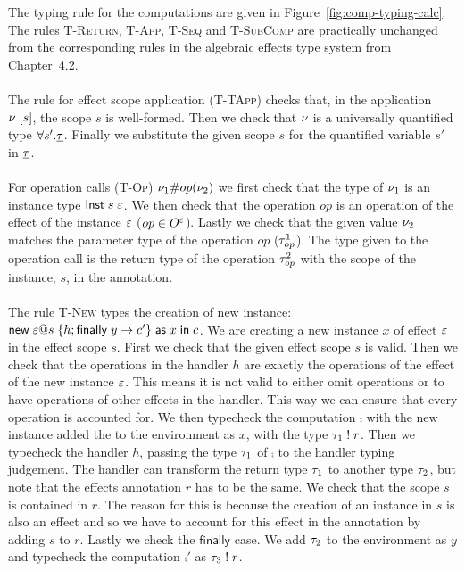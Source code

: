 {The typing rule for the computations are given in Figure~\ref{fig:comp-typing-calc}.
The rules \textsc{T-Return}, \textsc{T-App}, \textsc{T-Seq} and \textsc{T-SubComp} are practically unchanged from the corresponding rules in the algebraic effects type system from Chapter~4.2.
\\\\
The rule for effect scope application (\textsc{T-TApp}) checks that, in the application $\nu \; [ s ]$, the scope $s$ is well-formed.
Then we check that $\nu$ is a universally quantified type $\forall s' . \underline{\tau}$.
Finally we substitute the given scope $s$ for the quantified variable $s'$ in $\underline{\tau}$.
\\\\
For operation calls (\textsc{T-Op}) $\nu_1 \# op(\nu_2)$ we first check that the type of $\nu_1$ is an instance type $\mathsf{Inst} \; s \; \varepsilon$.
We then check that the operation $op$ is an operation of the effect of the instance $\varepsilon$ ($op \in O^{\varepsilon}$).
Lastly we check that the given value $\nu_2$ matches the parameter type of the operation $op$ ($\tau^1_{op}$).
The type given to the operation call is the return type of the operation $\tau^2_{op}$ with the scope of the instance, $s$, in the annotation.
\\\\
The rule \textsc{T-New} types the creation of new instance: $\mathsf{new} \; \varepsilon @ s \; \{ h; \mathsf{finally} \; y \rightarrow c' \} \; \mathsf{as} \; x \;\mathsf{in}\; c$.
We are creating a new instance $x$ of effect $\varepsilon$ in the effect scope $s$.
First we check that the given effect scope $s$ is valid.
Then we check that the operations in the handler $h$ are exactly the operations of the effect of the new instance $\varepsilon$.
This means it is not valid to either omit operations or to have operations of other effects in the handler.
This way we can ensure that every operation is accounted for.
We then typecheck the computation $\comp$ with the new instance added the to the environment as $x$, with the type $\tau_1 \; ! \; r$.
Then we typecheck the handler $h$, passing the type $\tau_1$ of $\comp$ to the handler typing judgement.
The handler can transform the return type $\tau_1$ to another type $\tau_2$, but note that the effects annotation $r$ has to be the same.
We check that the scope $s$ is contained in $r$.
The reason for this is because the creation of an instance in $s$ is also an effect and so we have to account for this effect in the annotation by adding $s$ to $r$.
Lastly we check the $\mathsf{finally}$ case.
We add $\tau_2$ to the environment as $y$ and typecheck the computation $\comp'$ as $\tau_3 \; ! \; r$.
}
